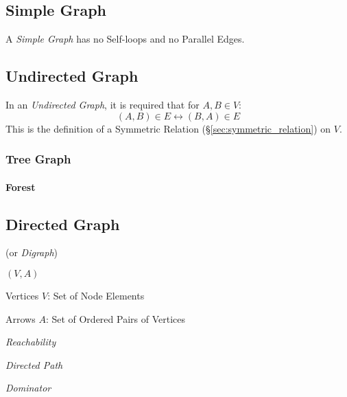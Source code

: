 \subsection{Simple Graph} \label{sec:simple_graph}

A \emph{Simple Graph} has no Self-loops and no Parallel Edges.



\subsection{Undirected Graph} \label{sec:undirected_graph}

In an \emph{Undirected Graph}, it is required that for $A,B \in V$:
\[
    (A,B) \in E \leftrightarrow (B,A) \in E
\]
This is the definition of a Symmetric Relation
(\S\ref{sec:symmetric_relation}) on $V$.



\subsubsection{Tree Graph}\label{sec:tree_graph}

\paragraph{Forest} \label{sec:forest}



\subsection{Directed Graph} \label{sec:directed_graph}

(or \emph{Digraph})

$(V,A)$

Vertices $V$: Set of Node Elements

Arrows $A$: Set of Ordered Pairs of Vertices



\emph{Reachability}

\emph{Directed Path}

\emph{Dominator}

